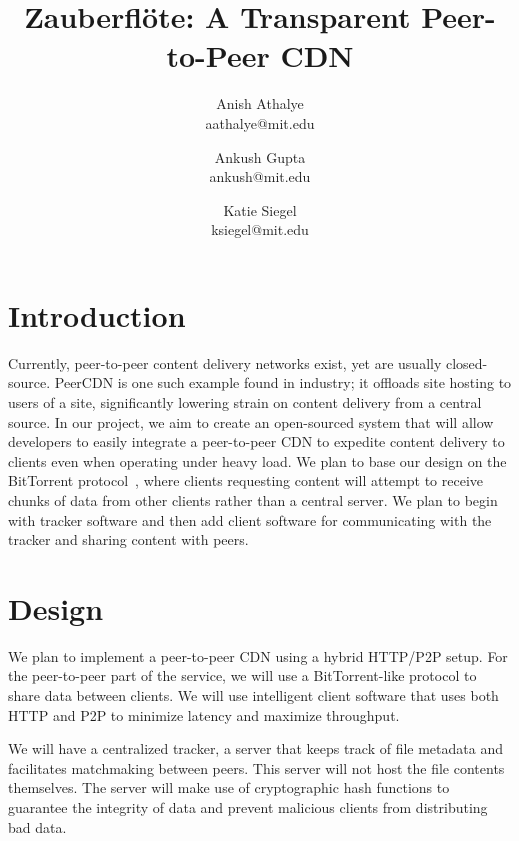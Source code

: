 \documentclass[letterpaper,twocolumn,10pt]{article}
\begin{document}
\title{\Large \bf Zauberfl\"{o}te: A Transparent Peer-to-Peer CDN}

\author{
    {\rm Anish Athalye}\\
    aathalye@mit.edu
    \and
    {\rm Ankush Gupta}\\
    ankush@mit.edu
    \and
    {\rm Katie Siegel}\\
    ksiegel@mit.edu
}

\maketitle

\thispagestyle{empty}

\section{Introduction}


Currently, peer-to-peer content delivery networks exist, yet are usually
closed-source. PeerCDN is one such example found in industry; it offloads site
hosting to users of a site, significantly lowering strain on content delivery
from a central source. In our project, we aim to create an open-sourced system
that will allow developers to easily integrate a peer-to-peer CDN to expedite
content delivery to clients even when operating under heavy load. We plan to
base our design on the BitTorrent protocol~\cite{cohen:bittorrent}, where
clients requesting content will attempt to receive chunks of data from other
clients rather than a central server. We plan to begin with tracker software
and then add client software for communicating with the tracker and sharing
content with peers.

\section{Design}

We plan to implement a peer-to-peer CDN using a hybrid HTTP/P2P setup. For the
peer-to-peer part of the service, we will use a BitTorrent-like protocol to
share data between clients. We will use intelligent client software that uses
both HTTP and P2P to minimize latency and maximize throughput.

We will have a centralized tracker, a server that keeps track of file metadata
and facilitates matchmaking between peers. This server will not host the file
contents themselves. The server will make use of cryptographic hash functions
to guarantee the integrity of data and prevent malicious clients from
distributing bad data.
\end{document}
